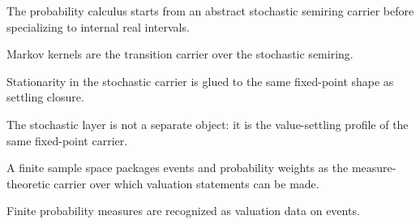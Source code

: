 \begin{theorem}\label{thm:stochastic-semiring-carrier}\leanok{}
The probability calculus starts from an abstract stochastic semiring carrier before specializing to
internal real intervals.
\end{theorem}

\begin{theorem}\label{thm:markov-kernel-carrier}\leanok{}
Markov kernels are the transition carrier over the stochastic semiring.
\end{theorem}

\begin{theorem}\label{thm:markov-stationary-closure-fixed}\leanok{}
Stationarity in the stochastic carrier is glued to the same fixed-point shape as settling closure.
\end{theorem}

\begin{theorem}\label{thm:stochastic-is-value-settling}\leanok{}
The stochastic layer is not a separate object: it is the value-settling profile of the same fixed-point
carrier.
\end{theorem}

\begin{theorem}\label{thm:finite-probability-measure-carrier}\leanok{}
A finite sample space packages events and probability weights as the measure-theoretic carrier over
which valuation statements can be made.
\end{theorem}

\begin{theorem}\label{thm:measure-is-valuation}\leanok{}
Finite probability measures are recognized as valuation data on events.
\end{theorem}


